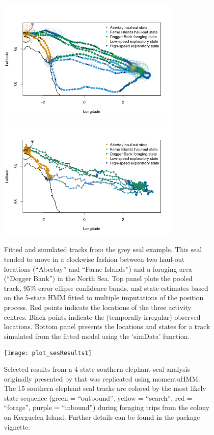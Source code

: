 \documentclass[12pt]{article}\usepackage[]{graphicx}\usepackage[]{color}
\begin{document}
\begin{figure}[htbp]
  \centering
    \includegraphics[width=0.8\textwidth]{plot_greySealResults1.png}\\
    \includegraphics[width=0.8\textwidth]{plot_greySealResults2.png}
  \caption{Fitted and simulated tracks from the grey seal example. This seal tended to move in a clockwise fashion between two haul-out locations (``Abertay'' and ``Farne Islands'') and a foraging area (``Dogger Bank'') in the North Sea. Top panel plots the pooled track, 95\% error ellipse confidence bands, and state estimates based on the 5-state HMM fitted to multiple imputations of the position process. Red points indicate the locations of the three activity centres. Black points indicate the (temporally-irregular) observed locations. Bottom panel presents the locations and states for a track simulated from the fitted model using the `simData' function.}
  \label{fig:greySealStateSims}
\end{figure}

\begin{figure}[htbp]
  \centering
  \texttt{[image: plot\_sesResults1]}
  \caption{Selected results from a 4-state southern elephant seal analysis originally presented by \cite{MichelotEtAl2017} that was replicated using momentuHMM. The 15 southern elephant seal tracks are colored by the most likely state sequence (green = ``outbound'', yellow = ``search'', red = ``forage'', purple = ``inbound'') during foraging trips from the colony on Kerguelen Island. Further details can be found in the package vignette.}
  \label{fig:sesTracks}
\end{figure}
\end{document}
